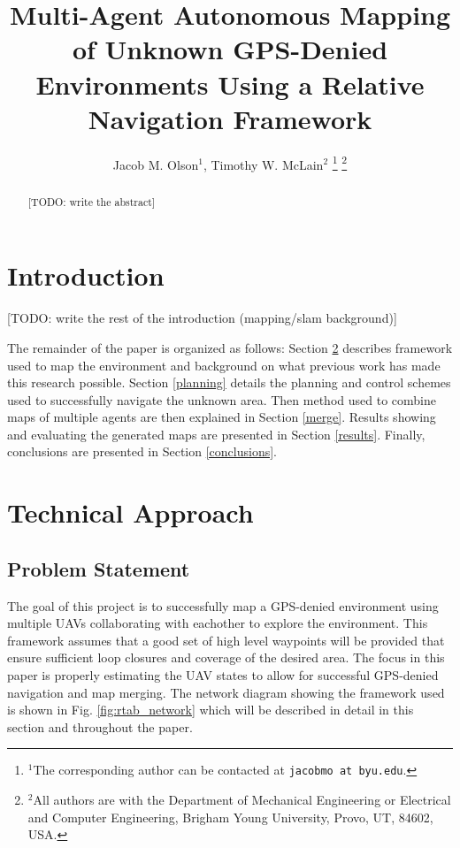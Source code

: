 \documentclass[letterpaper, 10 pt, conference]{ieeeconf}  %
\title{\LARGE \bf
Multi-Agent Autonomous Mapping of Unknown GPS-Denied Environments Using a Relative Navigation Framework}
\author{Jacob M. Olson$^{1}$, Timothy W. McLain$^{2}$ \todo{include Matthiew Labbe?}%
\thanks{$^{1}$The corresponding author can be contacted at
        {\tt\small jacobmo at byu.edu}.}%
\thanks{$^{2}$All authors are with the Department of Mechanical Engineering or Electrical and Computer Engineering,
        Brigham Young University, Provo, UT, 84602, USA.}%
}
\newcommand{\todo}[1]{{\color{blue}[TODO: #1]}}
\begin{document}
\maketitle
\thispagestyle{empty}
\pagestyle{empty}


\begin{abstract}

\todo{write the abstract}

\end{abstract}


\section{Introduction}

\todo{write the rest of the introduction (mapping/slam background)}

The remainder of the paper is organized as follows: Section \ref{approach} describes framework used to map the environment and background on what previous work has made this research possible. Section \ref{planning} details the planning and control schemes used to successfully navigate the unknown area. Then method used to combine maps of multiple agents are then explained in Section \ref{merge}. Results showing and evaluating the generated maps are presented in Section \ref{results}. Finally, conclusions are presented in Section \ref{conclusions}.

\section{Technical Approach}\label{approach}

\subsection{Problem Statement}

The goal of this project is to successfully map a GPS-denied environment using multiple UAVs collaborating with eachother to explore the environment. This framework assumes that a good set of high level waypoints will be provided that ensure sufficient loop closures and coverage of the desired area. The focus in this paper is properly estimating the UAV states to allow for successful GPS-denied navigation and map merging. The network diagram showing the framework used is shown in Fig. \ref{fig:rtab_network} which will be described in detail in this section and throughout the paper.
\end{document}

